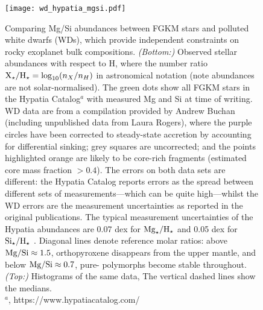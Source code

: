 \begin{figure}
  \centering
  \texttt{[image: wd\_hypatia\_mgsi.pdf]}
\caption[Comparing Mg/Si ratios between FGKM stars and polluted white dwarfs, which provide independent constraints on rocky exoplanet bulk compositions.]{Comparing Mg/Si abundances between FGKM stars and polluted white dwarfs (WDs), which provide independent constraints on rocky exoplanet bulk compositions. \textit{(Bottom:)} Observed stellar abundances with respect to H, where the number ratio ${\rm X}_\star/{\rm H}_\star = \log_{10}(n_X/n_H)$ in astronomical notation (note abundances are not solar-normalised). The green dots show all FGKM stars in the Hypatia Catalog$^a$ with measured Mg and Si at time of writing. WD data are from a compilation provided by Andrew Buchan (including unpublished data from Laura Rogers), where the purple circles have been corrected to steady-state accretion by accounting for differential sinking; grey squares are uncorrected; and the points highlighted orange are likely to be core-rich fragments (estimated core mass fraction $> 0.4$). The errors on both data sets are different: the Hypatia Catalog reports errors as the spread between different sets of measurements---which can be quite high---whilst the WD errors are the measurement uncertainties as reported in the original publications. The typical measurement uncertainties of the Hypatia abundances are 0.07 dex for ${\rm Mg}_\star/{\rm H}_\star$ and 0.05 dex for ${\rm Si}_\star/{\rm H}_\star$ \citep{hinkel_stellar_2014}. Diagonal lines denote reference molar ratios: above ${\rm Mg/Si} \approx 1.5$, orthopyroxene disappears from the upper mantle, and below ${\rm Mg/Si} \approx 0.7$, pure- polymorphs become stable throughout. \textit{(Top:)} Histograms of the same data, The vertical dashed lines show the medians.\\ 
\vspace*{10.5em} \footnotesize{$^a$\citet{hinkel_stellar_2014, hinkel_comparison_2016}, https://www.hypatiacatalog.com/}
}
\label{fig:hypatia_vs_pwd}
\end{figure}

